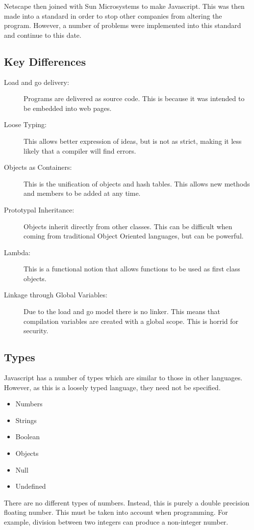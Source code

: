 			Netscape then joined with Sun Microsystems to make Javascript.
			This was then made into a standard in order to stop other companies from altering the program.
			However, a number of problems were implemented into this standard and continue to this date.
		\subsection{Key Differences}
			\begin{description}
				\item[Load and go delivery:] Programs are delivered as source code.
					This is because it was intended to be embedded into web pages.
				\item[Loose Typing:] This allows better expression of ideas,
					but is not as strict, making it less likely that a compiler will find errors.
				\item[Objects as Containers:] This is the unification of objects and hash tables.
					This allows new methods and members to be added at any time.
				\item[Prototypal Inheritance:] Objects inherit directly from other classes.
					This can be difficult when coming from traditional Object Oriented languages, but can be powerful.
				\item[Lambda:] This is a functional notion that allows functions to be used as first class objects.
				\item[Linkage through Global Variables:] Due to the load and go model there is no linker.
					This means that compilation variables are created with a global scope.
					This is horrid for security.
			\end{description}
		\subsection{Types}
			Javascript has a number of types which are similar to those in other languages.
			However, as this is a loosely typed language, they need not be specified.
			\begin{itemize}
				\item Numbers
				\item Strings
				\item Boolean
				\item Objects
				\item Null
				\item Undefined
			\end{itemize}
			There are no different types of numbers.
			Instead, this is purely a double precision floating number.
			This must be taken into account when programming.
			For example, division between two integers can produce a non-integer number.

